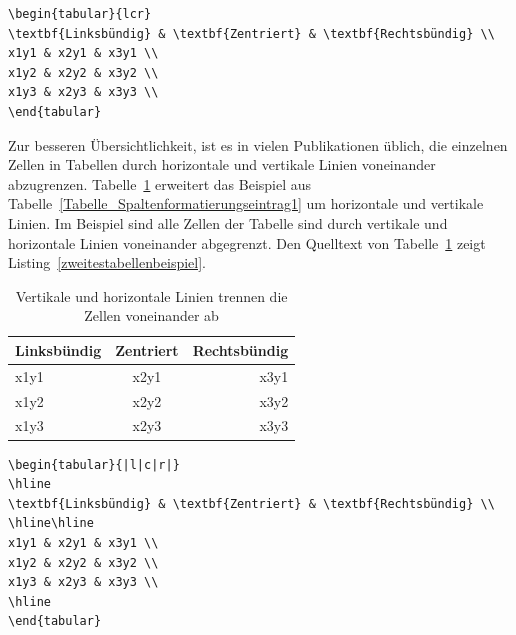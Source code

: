 \documentclass[a4paper,10pt,twoside]{scrbook}
\begin{document}
\begin{lstlisting}[caption={Das allererste Beispiel},label=erstestabellenbeispiel, style=customlatex]
\begin{tabular}{lcr}
\textbf{Linksbündig} & \textbf{Zentriert} & \textbf{Rechtsbündig} \\
x1y1 & x2y1 & x3y1 \\
x1y2 & x2y2 & x3y2 \\
x1y3 & x2y3 & x3y3 \\
\end{tabular}
\end{lstlisting}

Zur besseren Übersichtlichkeit, ist es in vielen Publikationen üblich, die einzelnen Zellen in Tabellen durch horizontale und vertikale Linien voneinander abzugrenzen. 
Tabelle~\ref{Tabelle_Spaltenformatierungseintrag2} erweitert das Beispiel aus Tabelle~\ref{Tabelle_Spaltenformatierungseintrag1} um horizontale und vertikale Linien. Im Beispiel sind alle Zellen der Tabelle sind durch vertikale und horizontale Linien voneinander abgegrenzt.
Den Quelltext von Tabelle~\ref{Tabelle_Spaltenformatierungseintrag2} zeigt Listing~\ref{zweitestabellenbeispiel}. 


\begin{table}[h!tb]
\centering
\caption{Vertikale und horizontale Linien trennen die Zellen voneinander ab}
\label{Tabelle_Spaltenformatierungseintrag2}
\begin{tabular}{|l|c|r|}
\hline
\textbf{Linksbündig} & \textbf{Zentriert} & \textbf{Rechtsbündig} \\
\hline\hline
x1y1 & x2y1 & x3y1 \\
x1y2 & x2y2 & x3y2 \\
x1y3 & x2y3 & x3y3 \\
\hline
\end{tabular}
\end{table}



\begin{lstlisting}[caption={Vertikale und horizontale Linien grenzen die Zellen der Tabelle voneinander ab},label=zweitestabellenbeispiel, style=customlatex]
\begin{tabular}{|l|c|r|}
\hline
\textbf{Linksbündig} & \textbf{Zentriert} & \textbf{Rechtsbündig} \\
\hline\hline
x1y1 & x2y1 & x3y1 \\
x1y2 & x2y2 & x3y2 \\
x1y3 & x2y3 & x3y3 \\
\hline
\end{tabular}
\end{lstlisting}
\end{document}
